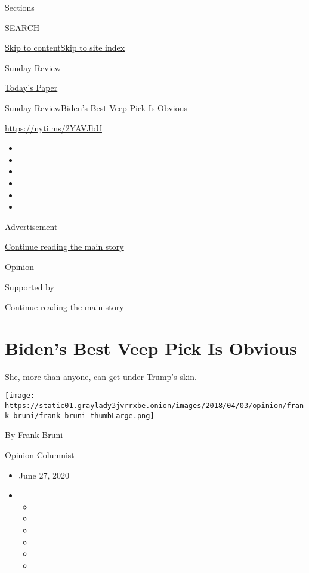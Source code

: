 Sections

SEARCH

\protect\hyperlink{site-content}{Skip to
content}\protect\hyperlink{site-index}{Skip to site index}

\href{https://www.nytimes3xbfgragh.onion/section/opinion/sunday}{Sunday
Review}

\href{https://myaccount.nytimes3xbfgragh.onion/auth/login?response_type=cookie\&client_id=vi}{}

\href{https://www.nytimes3xbfgragh.onion/section/todayspaper}{Today's
Paper}

\href{/section/opinion/sunday}{Sunday Review}\textbar{}Biden's Best Veep
Pick Is Obvious

\href{https://nyti.ms/2YAVJbU}{https://nyti.ms/2YAVJbU}

\begin{itemize}
\item
\item
\item
\item
\item
\item
\end{itemize}

Advertisement

\protect\hyperlink{after-top}{Continue reading the main story}

\href{/section/opinion}{Opinion}

Supported by

\protect\hyperlink{after-sponsor}{Continue reading the main story}

\hypertarget{bidens-best-veep-pick-is-obvious}{%
\section{Biden's Best Veep Pick Is
Obvious}\label{bidens-best-veep-pick-is-obvious}}

She, more than anyone, can get under Trump's skin.

\href{https://www.nytimes3xbfgragh.onion/by/frank-bruni}{\texttt{[image: https://static01.graylady3jvrrxbe.onion/images/2018/04/03/opinion/frank-bruni/frank-bruni-thumbLarge.png]}}

By \href{https://www.nytimes3xbfgragh.onion/by/frank-bruni}{Frank Bruni}

Opinion Columnist

\begin{itemize}
\item
  June 27, 2020
\item
  \begin{itemize}
  \item
  \item
  \item
  \item
  \item
  \item
  \end{itemize}
\end{itemize}

